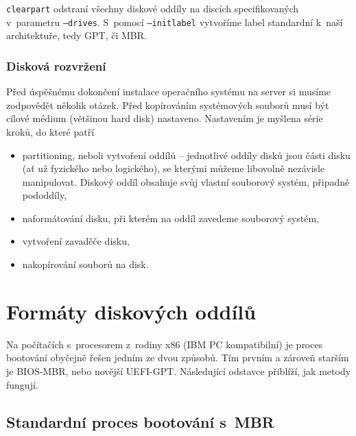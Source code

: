 		\texttt{clearpart} odstraní všechny diskové oddíly na discích specifikovaných v~parametru \texttt{--drives}. S~pomocí \texttt{--initlabel} vytvoříme label standardní k~naší architektuře, tedy GPT, či MBR.


\subsubsection{Disková rozvržení}

Před úspěšnému dokončení instalace operačního systému na server si musíme zodpovědět několik otázek. Před kopírováním systémových souborů musí být cílové médium (většinou hard disk) nastaveno. Nastavením je myšlena série kroků, do které patří

\begin{itemize}

\item partitioning, neboli vytvoření oddílů -- jednotlivé oddíly disků jsou části disku (ať už fyzického nebo logického), se kterými můžeme libovolně nezávisle manipulovat. Diskový oddíl obsahuje svůj vlastní souborový systém, připadně pododdíly,
\item naformátování disku, při kterém na oddíl zavedeme souborový systém,
\item vytvoření zavaděče disku,
\item nakopírování souborů na disk.
\end{itemize}


\section{Formáty diskových oddílů}


Na počítačích s~procesorem z~rodiny x86 (IBM PC kompatibilní) je proces bootování obyčejně řešen jedním ze dvou způsobů. Tím prvním a zároveň starším je BIOS-MBR, nebo novější UEFI-GPT. Následující odstavce přiblíží, jak metody fungují.


\subsection{Standardní proces bootování s~MBR}


